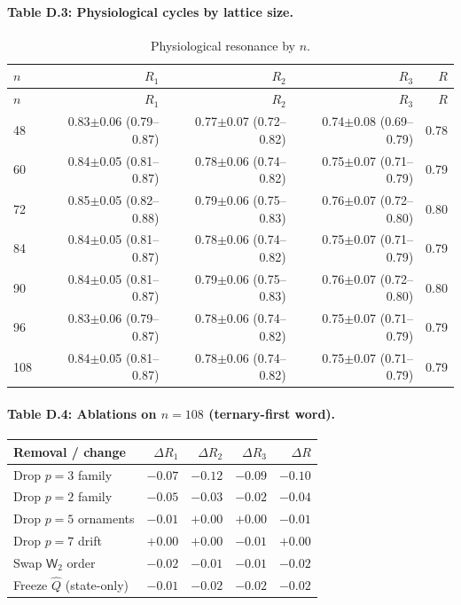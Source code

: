 \documentclass[12pt]{article}
\numberwithin{equation}{section}
\theoremstyle{plain}
\theoremstyle{definition}
\theoremstyle{remark}
\begin{document}
\paragraph{Table D.3: Physiological cycles by lattice size.}
\begin{longtable}{lrrrr}
\caption{Physiological resonance by $n$. \label{tab:physio-by-n}}\\
\toprule
$n$ & $R_1$ & $R_2$ & $R_3$ & $R$ \\
\midrule
\endfirsthead
\toprule
$n$ & $R_1$ & $R_2$ & $R_3$ & $R$ \\
\midrule
\endhead
48  & 0.83$\pm$0.06 (0.79--0.87) & 0.77$\pm$0.07 (0.72--0.82) & 0.74$\pm$0.08 (0.69--0.79) & 0.78 \\
60  & 0.84$\pm$0.05 (0.81--0.87) & 0.78$\pm$0.06 (0.74--0.82) & 0.75$\pm$0.07 (0.71--0.79) & 0.79 \\
72  & 0.85$\pm$0.05 (0.82--0.88) & 0.79$\pm$0.06 (0.75--0.83) & 0.76$\pm$0.07 (0.72--0.80) & 0.80 \\
84  & 0.84$\pm$0.05 (0.81--0.87) & 0.78$\pm$0.06 (0.74--0.82) & 0.75$\pm$0.07 (0.71--0.79) & 0.79 \\
90  & 0.84$\pm$0.05 (0.81--0.87) & 0.79$\pm$0.06 (0.75--0.83) & 0.76$\pm$0.07 (0.72--0.80) & 0.80 \\
96  & 0.83$\pm$0.06 (0.79--0.87) & 0.78$\pm$0.06 (0.74--0.82) & 0.75$\pm$0.07 (0.71--0.79) & 0.79 \\
108 & 0.84$\pm$0.05 (0.81--0.87) & 0.78$\pm$0.06 (0.74--0.82) & 0.75$\pm$0.07 (0.71--0.79) & 0.79 \\
\bottomrule
\end{longtable}

\paragraph{Table D.4: Ablations on $n=108$ (ternary-first word).}
\begin{tabular}{lrrrr}
\toprule
Removal / change & $\Delta R_1$ & $\Delta R_2$ & $\Delta R_3$ & $\Delta R$ \\
\midrule
Drop $p=3$ family         & $-0.07$ & $-0.12$ & $-0.09$ & $-0.10$ \\
Drop $p=2$ family         & $-0.05$ & $-0.03$ & $-0.02$ & $-0.04$ \\
Drop $p=5$ ornaments      & $-0.01$ & $+0.00$ & $+0.00$ & $-0.01$ \\
Drop $p=7$ drift          & $+0.00$ & $+0.00$ & $-0.01$ & $+0.00$ \\
Swap $\mathsf{W}_2$ order & $-0.02$ & $-0.01$ & $-0.01$ & $-0.02$ \\
Freeze $\hat{Q}$ (state-only) & $-0.01$ & $-0.02$ & $-0.02$ & $-0.02$ \\
\bottomrule
\end{tabular}
\end{document}
